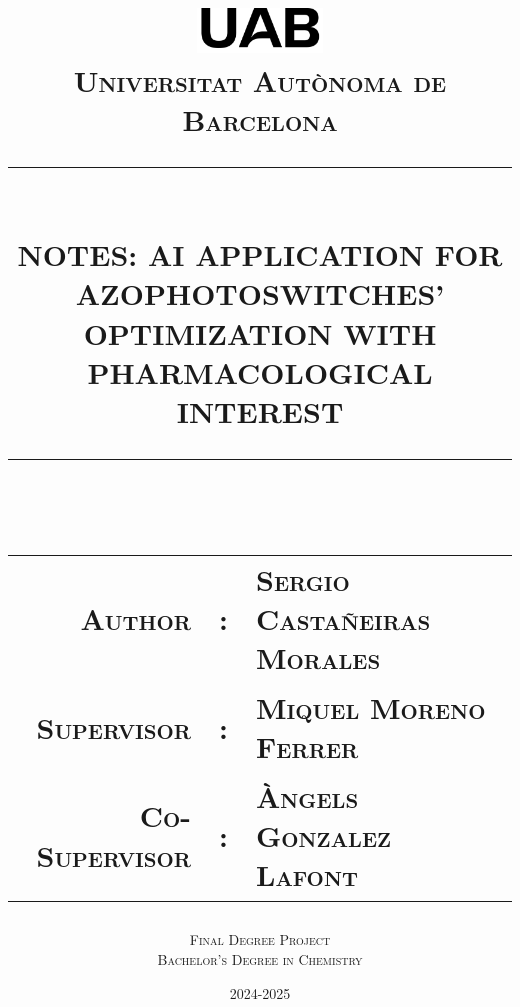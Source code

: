\documentclass[12pt,letterpaper]{article}
\newcommand{\HRule}[1]{\rule{\linewidth}{#1}}
\newcommand\subject{Final Degree Project}
\newcommand\degree{Bachelor's Degree in Chemistry}
\newcommand\documenttitle{Notes: AI application for azophotoswitches' optimization with pharmacological interest}
\newcommand\NetIDb{Universitat Autònoma de Barcelona}
\begin{document}
\title{\vspace{4cm} \normalsize 
		\includegraphics[width = 0.25\textwidth]{GeneralSources/UABLogo.png}\\ [0.5cm]
		\textsc{\NetIDb}\\ [2.0cm]
		\HRule{0.5pt} \\
		\LARGE \textbf{\uppercase{\documenttitle}}
		\HRule{2pt} \\ [1.5cm]
		\normalsize \begin{tabular}{rcl}  %
        \textsc{Author} & : & \textsc{Sergio Castañeiras Morales} \\
        \textsc{Supervisor} & : & \textsc{Miquel Moreno Ferrer} \\
        \textsc{Co-Supervisor} & : & \textsc{Àngels Gonzalez Lafont}
    \end{tabular}
    \normalsize \vspace*{5\baselineskip}
		}

\date{2024-2025}

\author{\large \textsc{\subject} \\ \textsc{\degree}}



\begin{titlepage}
\clearpage\maketitle
\thispagestyle{empty}
\end{titlepage}
\end{document}
